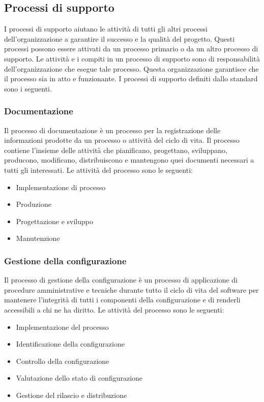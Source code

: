 \subsection{Processi di supporto}
I processi di supporto aiutano le attività di tutti gli altri processi dell'organizzazione a garantire il successo e la qualità del progetto. Questi processi possono essere attivati da un processo primario o da un altro processo di supporto.
Le attività e i compiti in un processo di supporto sono di responsabilità dell'organizzazione che esegue tale processo. Questa organizzazione garantisce che il processo sia in atto e funzionante.
I processi di supporto definiti dallo standard sono i seguenti.
\subsubsection{Documentazione}
Il processo di documentazione è un processo per la registrazione delle informazioni prodotte da un processo o attività del ciclo di vita. Il processo contiene l'insieme delle attività che pianificano, progettano, sviluppano, producono, modificano, distribuiscono e mantengono quei documenti necessari a tutti gli interessati.
Le attività del processo sono le seguenti:
\begin{itemize}
\item Implementazione di processo
\item Produzione
\item Progettazione e sviluppo
\item Manutenzione
\end{itemize}
\subsubsection{Gestione della configurazione}
Il processo di gestione della configurazione è un processo di applicazione di procedure amministrative e tecniche durante tutto il ciclo di vita del software per mantenere l'integrità di tutti i componenti della configurazione e di renderli accessibili a chi ne ha diritto.
Le attività del processo sono le seguenti:
\begin{itemize}
\item Implementazione del processo
\item Identificazione della configurazione
\item Controllo della configurazione
\item Valutazione dello stato di configurazione
\item Gestione del rilascio e distribuzione
\end{itemize}
